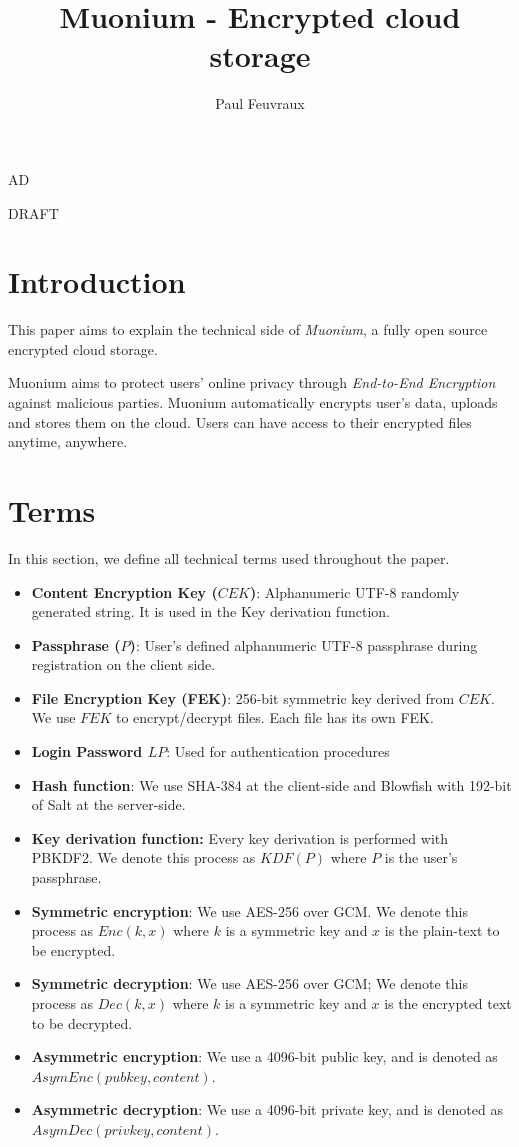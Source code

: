 AD\documentclass[a4paper,10pt]{article}
\title{Muonium - Encrypted cloud storage}
\author{Paul Feuvraux}
\begin{document}
\maketitle

DRAFT


\section{Introduction}
This paper aims to explain the technical side of \emph{Muonium}, a fully open source encrypted cloud storage.


Muonium aims to protect users' online privacy through \emph{End-to-End Encryption} against malicious parties. Muonium automatically encrypts user's data, uploads and stores them on the cloud. Users can have access to their encrypted files anytime, anywhere.

\section{Terms}
In this section, we define all technical terms used throughout the paper.

\begin{itemize}
    \item \textbf{Content Encryption Key ($CEK$)}:
        Alphanumeric UTF-8 randomly generated string. It is used in the Key derivation function.
    \item \textbf{Passphrase ($P$)}:
        User's defined alphanumeric UTF-8 passphrase during registration on the client side.
    \item \textbf{File Encryption Key (FEK)}:
        256-bit symmetric key derived from $CEK$. We use $FEK$ to encrypt/decrypt files. Each file has its own FEK.
    \item \textbf{Login Password $LP$}: Used for authentication procedures
    \item \textbf{Hash function}: We use SHA-384 at the client-side and Blowfish with 192-bit of Salt at the server-side.
    \item \textbf{Key derivation function:} Every key derivation is performed with PBKDF2. We denote this process as $KDF(P)$ where $P$ is the user's passphrase.
    \item \textbf{Symmetric encryption}: We use AES-256 over GCM.
        We denote this process as $Enc(k,x)$ where $k$ is a symmetric key and $x$ is the plain-text to be encrypted.
    \item \textbf{Symmetric decryption}: We use AES-256 over GCM;
        We denote this process as $Dec(k, x)$ where $k$ is a symmetric key and $x$ is the encrypted text to be decrypted.
		\item \textbf{Asymmetric encryption}: We use a 4096-bit public key, and is denoted as $AsymEnc(pubkey, content)$.
		\item \textbf{Asymmetric decryption}: We use a 4096-bit private key, and is denoted as $AsymDec(privkey, content)$.
\end{itemize}
\end{document}
